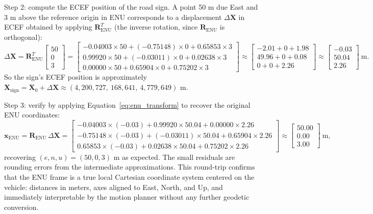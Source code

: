 \documentclass{book}
\begin{document}
Step 2: compute the ECEF position of the road sign.  A point
50 m due East and 3 m above the reference origin in ENU corresponds
to a displacement $\Delta\mathbf{X}$ in ECEF obtained by applying
$\mathbf{R}_{\text{ENU}}^T$ (the inverse rotation, since
$\mathbf{R}_{\text{ENU}}$ is orthogonal):
\[
  \Delta\mathbf{X} = \mathbf{R}_{\text{ENU}}^T
  \begin{bmatrix}50\\0\\3\end{bmatrix}
  =
  \begin{bmatrix}
    -0.04003\times50 + (-0.75148)\times0 + 0.65853\times3 \\
     0.99920\times50 + (-0.03011)\times0 + 0.02638\times3 \\
     0.00000\times50 +  0.65904\times0  + 0.75202\times3
  \end{bmatrix}
  \approx
  \begin{bmatrix}
    -2.01 + 0 + 1.98 \\
    49.96 + 0 + 0.08 \\
     0    + 0 + 2.26
  \end{bmatrix}
  \approx
  \begin{bmatrix}
    -0.03 \\ 50.04 \\ 2.26
  \end{bmatrix}\ \text{m}.
\]
So the sign's ECEF position is approximately
$\mathbf{X}_{\text{sign}} = \mathbf{X}_0 + \Delta\mathbf{X}
\approx (4{,}200{,}727,\ 168{,}641,\ 4{,}779{,}649)$ m.

Step 3: verify by applying Equation~\eqref{eq:enu_transform} to
recover the original ENU coordinates:
\[
  \mathbf{x}_{\text{ENU}}
  = \mathbf{R}_{\text{ENU}}\,\Delta\mathbf{X}
  = \begin{bmatrix}
    -0.04003\times(-0.03) + 0.99920\times50.04 + 0.00000\times2.26 \\
    -0.75148\times(-0.03) + (-0.03011)\times50.04 + 0.65904\times2.26 \\
     0.65853\times(-0.03) + 0.02638\times50.04 + 0.75202\times2.26
  \end{bmatrix}
  \approx
  \begin{bmatrix}50.00 \\ 0.00 \\ 3.00\end{bmatrix}\ \text{m},
\]
recovering $(e, n, u) = (50, 0, 3)$ m as expected.  The small
residuals are rounding errors from the intermediate approximations.
This round-trip confirms that the ENU frame is a true local Cartesian
coordinate system centered on the vehicle: distances in meters,
axes aligned to East, North, and Up, and immediately interpretable
by the motion planner without any further geodetic conversion.
\end{document}
